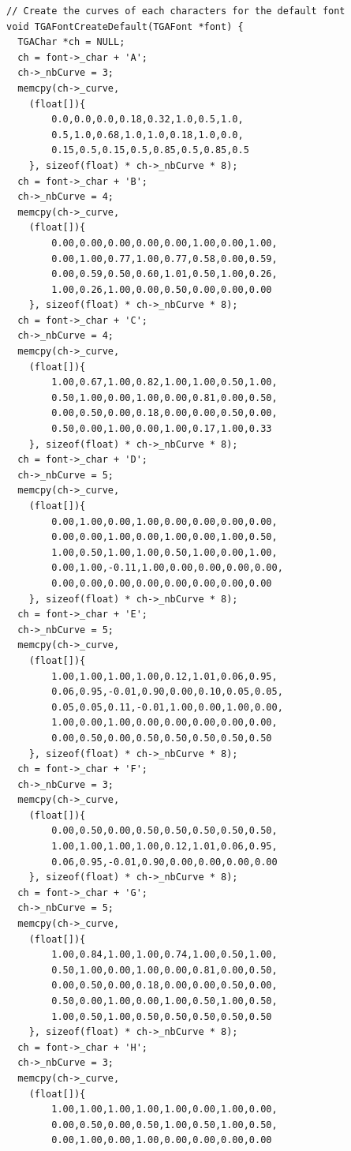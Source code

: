 \documentclass[12pt, a4paper]{article}
\begin{document}
\begin{scriptsize}
\begin{ttfamily}
\begin{lstlisting}
// Create the curves of each characters for the default font
void TGAFontCreateDefault(TGAFont *font) {
  TGAChar *ch = NULL;
  ch = font->_char + 'A';
  ch->_nbCurve = 3;
  memcpy(ch->_curve, 
    (float[]){
        0.0,0.0,0.0,0.18,0.32,1.0,0.5,1.0,
        0.5,1.0,0.68,1.0,1.0,0.18,1.0,0.0,
        0.15,0.5,0.15,0.5,0.85,0.5,0.85,0.5
    }, sizeof(float) * ch->_nbCurve * 8);
  ch = font->_char + 'B';
  ch->_nbCurve = 4;
  memcpy(ch->_curve, 
    (float[]){
        0.00,0.00,0.00,0.00,0.00,1.00,0.00,1.00,
        0.00,1.00,0.77,1.00,0.77,0.58,0.00,0.59,
        0.00,0.59,0.50,0.60,1.01,0.50,1.00,0.26,
        1.00,0.26,1.00,0.00,0.50,0.00,0.00,0.00
    }, sizeof(float) * ch->_nbCurve * 8);
  ch = font->_char + 'C';
  ch->_nbCurve = 4;
  memcpy(ch->_curve, 
    (float[]){
        1.00,0.67,1.00,0.82,1.00,1.00,0.50,1.00,
        0.50,1.00,0.00,1.00,0.00,0.81,0.00,0.50,
        0.00,0.50,0.00,0.18,0.00,0.00,0.50,0.00,
        0.50,0.00,1.00,0.00,1.00,0.17,1.00,0.33
    }, sizeof(float) * ch->_nbCurve * 8);
  ch = font->_char + 'D';
  ch->_nbCurve = 5;
  memcpy(ch->_curve, 
    (float[]){
        0.00,1.00,0.00,1.00,0.00,0.00,0.00,0.00,
        0.00,0.00,1.00,0.00,1.00,0.00,1.00,0.50,
        1.00,0.50,1.00,1.00,0.50,1.00,0.00,1.00,
        0.00,1.00,-0.11,1.00,0.00,0.00,0.00,0.00,
        0.00,0.00,0.00,0.00,0.00,0.00,0.00,0.00
    }, sizeof(float) * ch->_nbCurve * 8);
  ch = font->_char + 'E';
  ch->_nbCurve = 5;
  memcpy(ch->_curve, 
    (float[]){
        1.00,1.00,1.00,1.00,0.12,1.01,0.06,0.95,
        0.06,0.95,-0.01,0.90,0.00,0.10,0.05,0.05,
        0.05,0.05,0.11,-0.01,1.00,0.00,1.00,0.00,
        1.00,0.00,1.00,0.00,0.00,0.00,0.00,0.00,
        0.00,0.50,0.00,0.50,0.50,0.50,0.50,0.50
    }, sizeof(float) * ch->_nbCurve * 8);
  ch = font->_char + 'F';
  ch->_nbCurve = 3;
  memcpy(ch->_curve, 
    (float[]){
        0.00,0.50,0.00,0.50,0.50,0.50,0.50,0.50,
        1.00,1.00,1.00,1.00,0.12,1.01,0.06,0.95,
        0.06,0.95,-0.01,0.90,0.00,0.00,0.00,0.00
    }, sizeof(float) * ch->_nbCurve * 8);
  ch = font->_char + 'G';
  ch->_nbCurve = 5;
  memcpy(ch->_curve, 
    (float[]){
        1.00,0.84,1.00,1.00,0.74,1.00,0.50,1.00,
        0.50,1.00,0.00,1.00,0.00,0.81,0.00,0.50,
        0.00,0.50,0.00,0.18,0.00,0.00,0.50,0.00,
        0.50,0.00,1.00,0.00,1.00,0.50,1.00,0.50,
        1.00,0.50,1.00,0.50,0.50,0.50,0.50,0.50
    }, sizeof(float) * ch->_nbCurve * 8);
  ch = font->_char + 'H';
  ch->_nbCurve = 3;
  memcpy(ch->_curve, 
    (float[]){
        1.00,1.00,1.00,1.00,1.00,0.00,1.00,0.00,
        0.00,0.50,0.00,0.50,1.00,0.50,1.00,0.50,
        0.00,1.00,0.00,1.00,0.00,0.00,0.00,0.00

\end{lstlisting}
\end{ttfamily}
\end{scriptsize}
\end{document}
